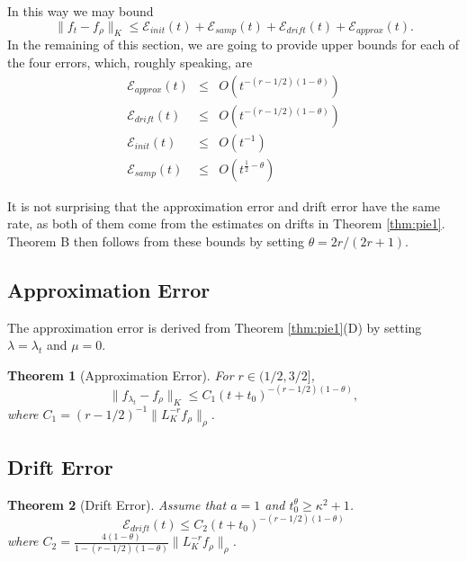 \documentclass[twoside,11pt]{amsart}
\theoremstyle{theorem}
\newtheorem{thm}{Theorem}[section]
\theoremstyle{definition}
\theoremstyle{remark}
\newcommand{\DS}{\displaystyle}
\def\Err{{\mathscr E}}
\def\t{t_0}
\def\la{\lambda}
\begin{document}
In this way we may bound
\[ \|f_t - f_\rho\|_K \leq \Err_{init}(t) + \Err_{samp}(t) + \Err_{drift}(t) + \Err_{approx}(t). \]
In the remaining of this section, we are going to provide upper bounds for each of the four errors, which, roughly speaking, are
\begin{eqnarray*} 
\Err_{approx}(t)  & \leq & O( t^{-(r-1/2)(1-\theta)} ) \\
 \Err_{drift}(t) & \leq & O( t^{-(r-1/2)(1-\theta)}) \\
 \Err_{init}(t) & \leq & O( t^{-1})  \\
 \Err_{samp}(t) & \leq & O( t^{\frac{1}{2} - \theta} )
\end{eqnarray*}

It is not surprising that the approximation error and drift error have the same rate, as both of them come from
the estimates on drifts in Theorem \ref{thm:pie1}. Theorem B then follows from these bounds by setting $\theta=2r/(2r+1)$.


\subsection{Approximation Error}

The approximation error is derived from Theorem \ref{thm:pie1}(D) by setting $\la=\la_t$ and $\mu=0$. 
\begin{thm}[Approximation Error] \label{err:approx} For $r\in (1/2,3/2]$,
\[ \|f_{\la_t} - f_\rho \|_K \leq C_1 (t+\t)^{-(r-1/2)(1-\theta)}, \]
where $C_1=(r-1/2)^{-1}\| L^{-r}_K f_\rho \|_\rho$.
\end{thm}


\subsection{Drift Error}

\begin{thm}[Drift Error] \label{err:drift} Assume that $a=1$ and $\t^\theta \geq \kappa^2+1$.
\[ \Err_{drift}(t)\leq C_2 (t+\t)^{-(r-1/2)(1-\theta)} \]
where $\DS C_2=\frac{4(1-\theta)}{1-(r-1/2)(1-\theta)}\|L_K^{-r} f_\rho\|_\rho$.
\end{thm}
\end{document}
